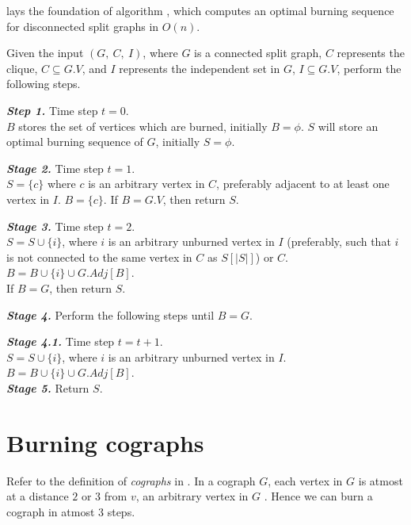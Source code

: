  lays the foundation of algorithm , which computes an optimal burning sequence for disconnected split graphs in $O(n)$.

\begin{algorithm}\label{algorithm:burning-general-split-graphs}
    Given the input $(G,\ C,\ I)$, where $G$ is a connected split graph, $C$ represents the clique, $C\subseteq G.V$, and $I$ represents the independent set in $G$, $I\subseteq G.V$, perform the following steps.
\end{algorithm}

\textbf{\textit{Step 1.}} Time step $t=0$.\\
$B$ stores the set of vertices which are burned, initially $B=\phi$. $S$ will store an optimal burning sequence of $G$, initially $S=\phi$.

\textbf{\textit{Stage 2.}} Time step $t=1$.\\
$S=\{c\}$ where $c$ is an arbitrary vertex in $C$, preferably adjacent to at least one vertex in $I$. $B=\{c\}$. If $B=G.V$, then return $S$.

\textbf{\textit{Stage 3.}} Time step $t=2$.\\
$S = S\cup \{i\}$, where $i$ is an arbitrary unburned vertex in $I$ (preferably, such that $i$ is not connected to the same vertex in $C$ as $S[|S|]$) or $C$. $B = B \cup \{i\} \cup G.Adj[B]$.\\
If $B=G$, then return $S$.

\textbf{\textit{Stage 4.}} Perform the following steps until $B=G$.

\textbf{\textit{Stage 4.1.}} Time step $t=t+1$.\\
$S = S\cup \{i\}$, where $i$ is an arbitrary unburned vertex in $I$. $B = B \cup \{i\} \cup G.Adj[B]$.\\

\textbf{\textit{Stage 5.}} Return $S$.

\section{Burning cographs}

Refer to the definition of \textit{cographs} in . In a cograph $G$, each vertex in $G$ is atmost at a distance $2$ or $3$ from $v$, an arbitrary vertex in $G$ \cite{Kare2019}. Hence we can burn a cograph in atmost $3$ steps.

% 
% 
